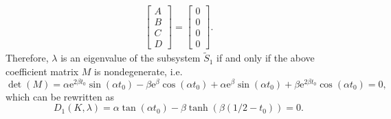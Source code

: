 \documentclass[a4paper,11pt]{article}
\begin{document}
\begin{appendices}
\begin{equation*}
\begin{split}
\left[\begin{array}{c} A \\ B \\ C \\ D \end{array}\right]
=
\left[\begin{array}{c} 0 \\ 0 \\ 0 \\ 0 \end{array}\right].
\end{split}
\end{equation*}
Therefore, $\lambda$ is an eigenvalue of the subsystem $\tilde{S}_1$ if and only if the above coefficient matrix $M$ is nondegenerate, i.e.
\begin{equation*}
\det(M) = \alpha \mathrm{e}^{2 \beta t_0} \sin\!\left(\alpha t_0\right) - \beta \mathrm{e}^{\beta} \cos\!\left(\alpha t_0\right) + \alpha \mathrm{e}^{\beta} \sin\!\left(\alpha t_0\right) + \beta \mathrm{e}^{2 \beta t_0} \cos\!\left(\alpha t_0\right) = 0,
\end{equation*}
which can be rewritten as
\begin{equation*}
D_1(K, \lambda) = \alpha \tan(\alpha t_0) - \beta \tanh(\beta (1/2 - t_0)) = 0.
\end{equation*}


\end{appendices}
\end{document}
